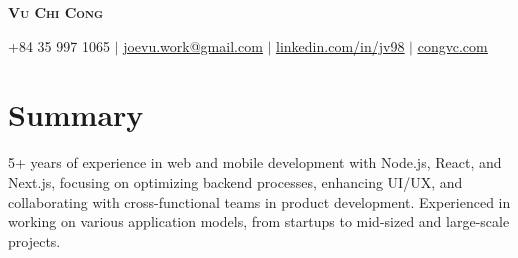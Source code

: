 \documentclass[letterpaper,11pt]{article}
\newcommand{\resumeDesc}[1]{
  {#1\\ \vspace{2px}}
}
\begin{document}

\begin{center}
    \textbf{\Huge \scshape Vu Chi Cong} \par \vspace{1pt}
    \small +84 35 997 1065 $|$ \href{mailto:joevu.work@gmail.com}{\underline{joevu.work@gmail.com}} $|$ 
    \href{https://linkedin.com/in/jv98}{\underline{linkedin.com/in/jv98}} $|$
    \href{https://congvc.com}{\underline{congvc.com}}
\end{center}

\section{Summary}
\resumeDesc{5+ years of experience in web and mobile development with Node.js, React, and Next.js, focusing on optimizing backend processes, enhancing UI/UX, and collaborating with cross-functional teams in product development. Experienced in working on various application models, from startups to mid-sized and large-scale projects.}


\end{document}
